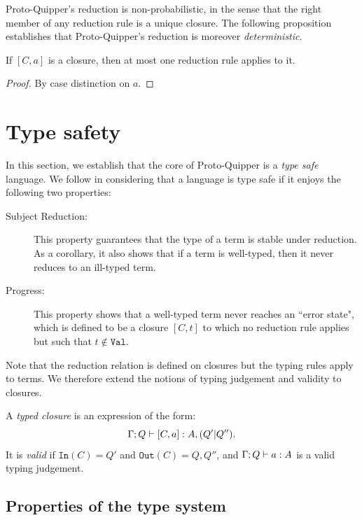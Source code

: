 \documentclass[twoside]{article}
\begin{document}
Proto-Quipper's reduction is non-probabilistic, in the sense that the 
right member of any reduction rule is a unique closure. The following 
proposition establishes that Proto-Quipper's reduction is moreover  
\emph{deterministic}.

\begin{proposition}
\label{determinicity}
If $[C,a]$ is a closure, then at most one reduction rule applies
to it.
\end{proposition}

\begin{proof}
By case distinction on $a$.
\end{proof}


\clearpage
\section{Type safety}\label{sec-type-safety}

In this section, we establish that the core of  Proto-Quipper 
is a \emph{type safe} language. We follow \cite{WrFe94} in 
considering that a language is type safe if it enjoys the 
following two properties: 
\begin{description}
  \item[Subject Reduction:] This property guarantees 
  that the type of a term is stable under reduction.
  As a corollary, it also shows that if a term is 
  well-typed, then it never reduces to an ill-typed 
  term.
  \item[Progress:] This property shows that a 
  well-typed term never reaches an ``error state", 
  which is defined to be a closure $[C,t]$ to which 
  no reduction rule applies but such that 
  $t\notin \mathtt{Val}$. 
\end{description}
Note that the reduction relation is defined on closures 
but the typing rules apply to terms. We therefore extend 
the notions of typing judgement and validity to closures.

\begin{definition}
A \emph{typed closure} is an expression of the form:
\[
\Gamma;Q\vdash [C,a]:A,(Q'|Q'').
\]
It is \emph{valid} if $\mathtt{In}(C)=Q'$ and $\mathtt{Out}(C)=Q,Q''$,
and $\Gamma;Q\vdash a:A$ is a valid typing judgement.
\end{definition}

\subsection{Properties of the type system}
\end{document}

